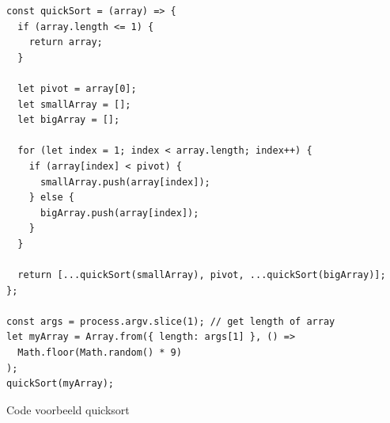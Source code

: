 \begin{listing}[H]
    \centering
    \begin{verbatim}
const quickSort = (array) => {
  if (array.length <= 1) {
    return array;
  }

  let pivot = array[0];
  let smallArray = [];
  let bigArray = [];

  for (let index = 1; index < array.length; index++) {
    if (array[index] < pivot) {
      smallArray.push(array[index]);
    } else {
      bigArray.push(array[index]);
    }
  }

  return [...quickSort(smallArray), pivot, ...quickSort(bigArray)];
};

const args = process.argv.slice(1); // get length of array
let myArray = Array.from({ length: args[1] }, () =>
  Math.floor(Math.random() * 9)
);
quickSort(myArray);
        \end{verbatim}
        \caption{\label{code:quicksort}Code voorbeeld quicksort}
\end{listing}

